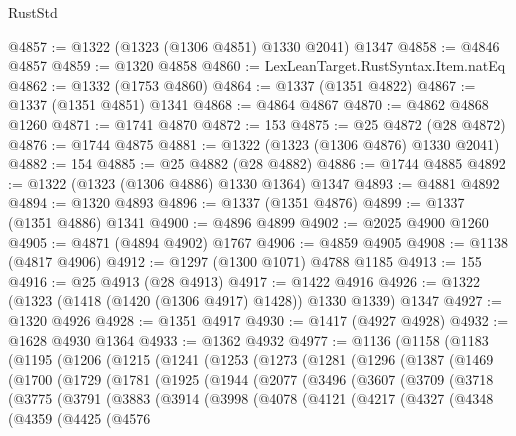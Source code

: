\begin{lexlean}{RustStd}
\begin{coremodule}
{\begin{coremodule}
{{{{{{{{{{{{{{{{{{{{{{{{{{{{{{{{{{@4857 := @1322 (@1323 (@1306 @4851) @1330 @2041) @1347
@4858 := @4846 @4857
@4859 := @1320 @4858
@4860 := LexLeanTarget.RustSyntax.Item.natEq
@4862 := @1332 (@1753 @4860)
@4864 := @1337 (@1351 @4822)
@4867 := @1337 (@1351 @4851) @1341
@4868 := @4864 @4867
@4870 := @4862 @4868 @1260
@4871 := @1741 @4870
@4872 := 153
@4875 := @25 @4872 (@28 @4872)
@4876 := @1744 @4875
@4881 := @1322 (@1323 (@1306 @4876) @1330 @2041)
@4882 := 154
@4885 := @25 @4882 (@28 @4882)
@4886 := @1744 @4885
@4892 := @1322 (@1323 (@1306 @4886) @1330 @1364) @1347
@4893 := @4881 @4892
@4894 := @1320 @4893
@4896 := @1337 (@1351 @4876)
@4899 := @1337 (@1351 @4886) @1341
@4900 := @4896 @4899
@4902 := @2025 @4900 @1260
@4905 := @4871 (@4894 @4902) @1767
@4906 := @4859 @4905
@4908 := @1138 (@4817 @4906)
@4912 := @1297 (@1300 @1071) @4788 @1185
@4913 := 155
@4916 := @25 @4913 (@28 @4913)
@4917 := @1422 @4916
@4926 := @1322 (@1323 (@1418 (@1420 (@1306 @4917) @1428)) @1330 @1339) @1347
@4927 := @1320 @4926
@4928 := @1351 @4917
@4930 := @1417 (@4927 @4928)
@4932 := @1628 @4930 @1364
@4933 := @1362 @4932
@4977 := @1136
    (@1158
      (@1183
        (@1195
          (@1206
            (@1215
              (@1241
                (@1253
                  (@1273
                    (@1281
                      (@1296
                        (@1387
                          (@1469
                            (@1700
                              (@1729
                                (@1781
                                  (@1925
                                    (@1944
                                      (@2077
                                        (@3496
                                          (@3607
                                            (@3709
                                              (@3718
                                                (@3775
                                                  (@3791
                                                    (@3883
                                                      (@3914
                                                        (@3998
                                                          (@4078
                                                            (@4121
                                                              (@4217
                                                                (@4327
                                                                  (@4348
                                                                    (@4359
                                                                      (@4425
                                                                        (@4576
}}}}}}}}}}}}}}}}}}}}}}}}}}}}}}}}}}
\end{coremodule}}
\end{coremodule}
\end{lexlean}
